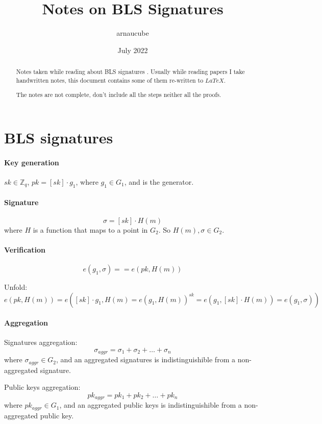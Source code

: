 \documentclass{article}
\title{Notes on BLS Signatures}
\author{arnaucube}
\date{July 2022}
\theoremstyle{definition}
\begin{document}
\maketitle

\begin{abstract}
	Notes taken while reading about BLS signatures \cite{bls-sig-eth2}. Usually while reading papers I take handwritten notes, this document contains some of them re-written to $LaTeX$.

	The notes are not complete, don't include all the steps neither all the proofs.
\end{abstract}


\section{BLS signatures}

\paragraph{Key generation}
$sk \in \mathbb{Z}_q$, $pk = [sk] \cdot g_1$, where $g_1 \in G_1$, and is the generator.

\paragraph{Signature}
$$\sigma = [sk] \cdot H(m)$$
where $H$ is a function that maps to a point in $G_2$. So $H(m), \sigma \in G_2$.

\paragraph{Verification}
$$e(g_1, \sigma) == e(pk, H(m))$$

Unfold:
$$e(pk, H(m)) = e([sk] \cdot g_1, H(m) = e(g_1, H(m))^{sk} = e(g_1, [sk] \cdot H(m)) = e(g_1, \sigma))$$

\paragraph{Aggregation}
Signatures aggregation:
$$\sigma_{aggr} = \sigma_1 + \sigma_2 + \ldots + \sigma_n$$
where $\sigma_{aggr} \in G_2$, and an aggregated signatures is indistinguishible from a non-aggregated signature.

\vspace{0.5cm}
Public keys aggregation:
$$pk_{aggr} = pk_1 + pk_2 + \ldots + pk_n$$
where $pk_{aggr} \in G_1$, and an aggregated public keys is indistinguishible from a non-aggregated public key.
\end{document}
